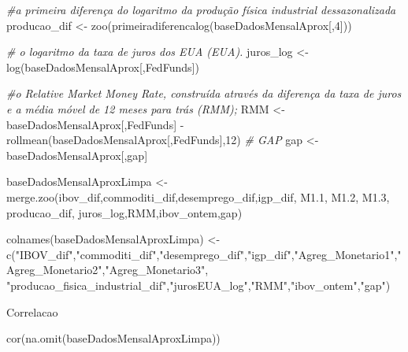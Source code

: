 \documentclass[
]{article}
\newenvironment{Shaded}{\begin{snugshade}}{\end{snugshade}}
\newcommand{\CommentTok}[1]{\textcolor[rgb]{0.56,0.35,0.01}{\textit{#1}}}
\newcommand{\DecValTok}[1]{\textcolor[rgb]{0.00,0.00,0.81}{#1}}
\newcommand{\FloatTok}[1]{\textcolor[rgb]{0.00,0.00,0.81}{#1}}
\newcommand{\FunctionTok}[1]{\textcolor[rgb]{0.00,0.00,0.00}{#1}}
\newcommand{\NormalTok}[1]{#1}
\newcommand{\OtherTok}[1]{\textcolor[rgb]{0.56,0.35,0.01}{#1}}
\newcommand{\SpecialCharTok}[1]{\textcolor[rgb]{0.00,0.00,0.00}{#1}}
\newcommand{\StringTok}[1]{\textcolor[rgb]{0.31,0.60,0.02}{#1}}
\begin{document}
\begin{Shaded}
\begin{Highlighting}[]
\CommentTok{\#a primeira diferença do logaritmo da produção física industrial dessazonalizada}
\NormalTok{producao\_dif }\OtherTok{\textless{}{-}} \FunctionTok{zoo}\NormalTok{(}\FunctionTok{primeiradiferencalog}\NormalTok{(baseDadosMensalAprox[,}\DecValTok{4}\NormalTok{]))}

\CommentTok{\# o logaritmo da taxa de juros dos EUA (EUA).}
\NormalTok{juros\_log }\OtherTok{\textless{}{-}} \FunctionTok{log}\NormalTok{(baseDadosMensalAprox[,}\StringTok{\textquotesingle{}FedFunds\textquotesingle{}}\NormalTok{])}

\CommentTok{\#o Relative Market Money Rate, construída através da diferença da taxa de juros e a média móvel de 12 meses para trás (RMM);}
\NormalTok{RMM }\OtherTok{\textless{}{-}}\NormalTok{ baseDadosMensalAprox[,}\StringTok{\textquotesingle{}FedFunds\textquotesingle{}}\NormalTok{] }\SpecialCharTok{{-}} \FunctionTok{rollmean}\NormalTok{(baseDadosMensalAprox[,}\StringTok{\textquotesingle{}FedFunds\textquotesingle{}}\NormalTok{],}\DecValTok{12}\NormalTok{)}
\CommentTok{\# GAP}
\NormalTok{gap }\OtherTok{\textless{}{-}}\NormalTok{ baseDadosMensalAprox[,}\StringTok{\textquotesingle{}gap\textquotesingle{}}\NormalTok{]}

\NormalTok{baseDadosMensalAproxLimpa }\OtherTok{\textless{}{-}} \FunctionTok{merge.zoo}\NormalTok{(ibov\_dif,commoditi\_dif,desemprego\_dif,igp\_dif, M1}\FloatTok{.1}\NormalTok{, M1}\FloatTok{.2}\NormalTok{, M1}\FloatTok{.3}\NormalTok{, producao\_dif, juros\_log,RMM,ibov\_ontem,gap)}

\FunctionTok{colnames}\NormalTok{(baseDadosMensalAproxLimpa) }\OtherTok{\textless{}{-}} \FunctionTok{c}\NormalTok{(}\StringTok{"IBOV\_dif"}\NormalTok{,}\StringTok{"commoditi\_dif"}\NormalTok{,}\StringTok{"desemprego\_dif"}\NormalTok{,}\StringTok{"igp\_dif"}\NormalTok{,}\StringTok{"Agreg\_Monetario1"}\NormalTok{,}\StringTok{"Agreg\_Monetario2"}\NormalTok{,}\StringTok{"Agreg\_Monetario3"}\NormalTok{,}
                         \StringTok{"producao\_fisica\_industrial\_dif"}\NormalTok{,}\StringTok{"jurosEUA\_log"}\NormalTok{,}\StringTok{"RMM"}\NormalTok{,}\StringTok{"ibov\_ontem"}\NormalTok{,}\StringTok{"gap"}\NormalTok{)}
\end{Highlighting}
\end{Shaded}

Correlacao

\begin{Shaded}
\begin{Highlighting}[]
\FunctionTok{cor}\NormalTok{(}\FunctionTok{na.omit}\NormalTok{(baseDadosMensalAproxLimpa))}
\end{Highlighting}
\end{Shaded}
\end{document}

